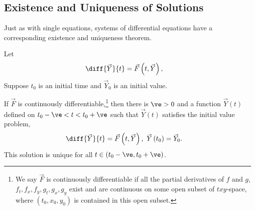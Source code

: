 \documentclass[10pt]{mypackage}
\begin{document}
\subsection{Existence and Uniqueness of Solutions}%
Just as with single equations, systems of differential equations have a corresponding existence and uniqueness theorem.
\begin{theorem}
  Let 
  \begin{align*}
    \diff{\vec{Y}}{t} &= \vec{F}\left(t,\vec{Y}\right),
  \end{align*}
  Suppose $t_0$ is an initial time and $\vec{Y}_0$ is an initial value.\newline

  If $\vec{F}$ is continuously differentiable,\footnote{We say $\vec{F}$ is continuously differentiable if all the partial derivatives of $f$ and $g$, $f_t,f_x,f_y,g_t,g_x,g_y$ exist and are continuous on some open subset of $txy$-space, where $\left(t_0,x_0,y_0\right)$ is contained in this open subset.} then there is $\ve > 0$ and a function $\vec{Y}(t)$ defined on $t_0-\ve < t < t_0 + \ve$ such that $\vec{Y}(t)$ satisfies the initial value problem,
  \begin{align*}
    \diff{\vec{Y}}{t} &= \vec{F}\left(t,\vec{Y}\right),~\vec{Y}\left(t_0\right) = \vec{Y}_0.
  \end{align*}
  This solution is unique for all $t\in \left(t_0-\ve,t_0+\ve\right)$.
\end{theorem}
\end{document}
